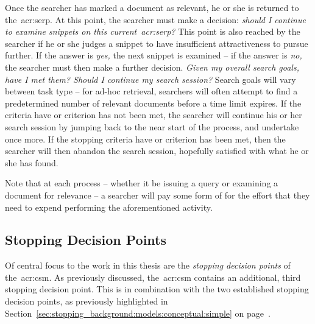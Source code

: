 Once the searcher has marked a document as relevant, he or she is returned to the~\gls{acr:serp}. At this point, the searcher must make a decision: \emph{should I continue to examine snippets on this current~\gls{acr:serp}?} This point is also reached by the searcher if he or she judges a snippet to have insufficient attractiveness to pursue further. If the answer is \emph{yes,} the next snippet is examined -- if the answer is \emph{no,} the searcher must then make a further decision. \emph{Given my overall search goals, have I met them? Should I continue my search session?} Search goals will vary between task type -- for ad-hoc retrieval, searchers will often attempt to find a predetermined number of relevant documents before a time limit expires. If the criteria have or criterion has not been met, the searcher will continue his or her search session by jumping back to the near start of the process, and undertake  once more. If the stopping criteria have or criterion has been met, then the searcher will then abandon the search session, hopefully satisfied with what he or she has found.

Note that at each process -- whether it be issuing a query or examining a document for relevance -- a searcher will pay some form of  for the effort that they need to expend performing the aforementioned activity.

%
%
%
%
%

\subsection{Stopping Decision Points}\label{sec:proposal:model:stopping_points}
Of central focus to the work in this thesis are the \emph{stopping decision points} of the~\gls{acr:csm}. As previously discussed, the~\gls{acr:csm} contains an additional, third stopping decision point. This is in combination with the two established stopping decision points, as previously highlighted in Section~\ref{sec:stopping_background:models:conceptual:simple} on page~\pageref{sec:stopping_background:models:conceptual:simple}.

